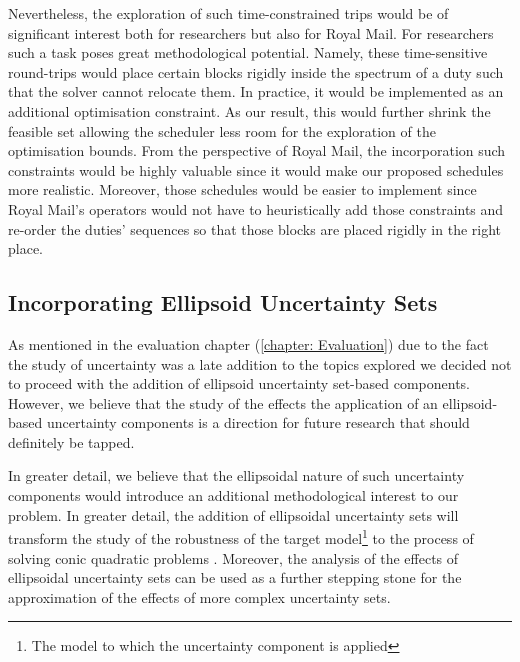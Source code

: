 \vspace{\baselineskip}
\noindent
Nevertheless, the exploration of such time-constrained trips would be of significant interest both for researchers but also for Royal Mail. For researchers such a task poses great methodological potential. Namely, these time-sensitive round-trips would place certain blocks rigidly inside the spectrum of a duty such that the solver cannot relocate them. In practice, it would be implemented as an additional optimisation constraint. As our result, this would further shrink the feasible set allowing the scheduler less room for the exploration of the optimisation bounds. From the perspective of Royal Mail, the incorporation such constraints would be highly valuable since it would make our proposed schedules more realistic. Moreover, those schedules would be easier to implement since Royal Mail's operators would not have to heuristically add those constraints and re-order the duties' sequences so that those blocks are placed rigidly in the right place. 

\subsection*{Incorporating Ellipsoid Uncertainty Sets}
As mentioned in the evaluation chapter (\ref{chapter: Evaluation}) due to the fact the study of uncertainty was a late addition to the topics explored we decided not to proceed with the addition of ellipsoid uncertainty set-based components. However, we believe that the study of the effects the application of an ellipsoid-based uncertainty components is a direction for future research that should definitely be tapped. 

\vspace{\baselineskip}
\noindent
In greater detail, we believe that the ellipsoidal nature of such uncertainty components would introduce an additional methodological interest to our problem. In greater detail, the addition of ellipsoidal uncertainty sets will transform the study of the robustness of the target model\footnote{The model to which the uncertainty component is applied} to the process of solving conic quadratic problems \cite{Ben-Tal2000}. Moreover, the analysis of the effects of ellipsoidal uncertainty sets can be used as a further stepping stone for the approximation of the effects of more complex uncertainty sets\cite{vertsimas}.